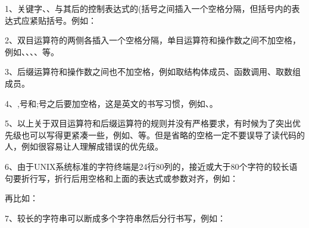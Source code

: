 1、关键字、、与其后的控制表达式的(括号之间插入一个空格分隔，但括号内的表达式应紧贴括号。例如：




2、双目运算符的两侧各插入一个空格分隔，单目运算符和操作数之间不加空格，例如、、、、等。



3、后缀运算符和操作数之间也不加空格，例如取结构体成员、函数调用、取数组成员。



4、,号和;号之后要加空格，这是英文的书写习惯，例如、。



5、以上关于双目运算符和后缀运算符的规则并没有严格要求，有时候为了突出优先级也可以写得更紧凑一些，例如、等。但是省略的空格一定不要误导了读代码的人，例如很容易让人理解成错误的优先级。



6、由于UNIX系统标准的字符终端是24行80列的，接近或大于80个字符的较长语句要折行写，折行后用空格和上面的表达式或参数对齐，例如：




再比如：




7、较长的字符串可以断成多个字符串然后分行书写，例如：




